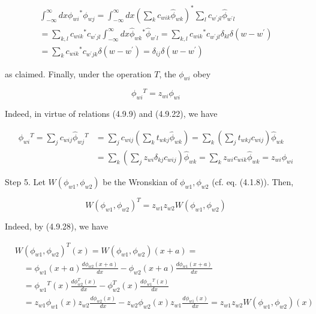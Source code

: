 \documentclass{article}
\begin{document}
\begin{gather*}
\int_{-\infty}^{\infty} d x \phi_{w i}{ }^{*} \phi_{w j}=\int_{-\infty}^{\infty} d x\left(\sum_{k} c_{w i k} \hat{\phi}_{w k}\right)^{*} \sum_{l} c_{w^{\prime} j l} \hat{\phi}_{w^{\prime} l}  \tag{4.9.27}\\
=\sum_{k, l} c_{w i k}{ }^{*} c_{w^{\prime} j l} \int_{-\infty}^{\infty} d x \hat{\phi}_{w k}{ }^{*} \hat{\phi}_{w^{\prime} l}=\sum_{k, l} c_{w i k}{ }^{*} c_{w^{\prime} j l} \delta_{k l} \delta\left(w-w^{\prime}\right) \\
=\sum_{k} c_{w i k}{ }^{*} c_{w^{\prime} j k} \delta\left(w-w^{\prime}\right)=\delta_{i j} \delta\left(w-w^{\prime}\right)
\end{gather*}
 
as claimed. Finally, under the operation $T$, the $\phi_{w i}$ obey
 
\begin{equation*}
\phi_{w i}{ }^{T}=z_{w i} \phi_{w i} \tag{4.9.28}
\end{equation*}
 

Indeed, in virtue of relations (4.9.9) and (4.9.22), we have
 
\begin{align*}
\phi_{w i}{ }^{T}=\sum_{j} c_{w i j} \hat{\phi}_{w j}{ }^{T} & =\sum_{j} c_{w i j}\left(\sum_{k} t_{w k j} \hat{\phi}_{w k}\right)=\sum_{k}\left(\sum_{j} t_{w k j} c_{w i j}\right) \hat{\phi}_{w k}  \tag{4.9.29}\\
& =\sum_{k}\left(\sum_{j} z_{w i} \delta_{k j} c_{w i j}\right) \hat{\phi}_{w k}=\sum_{k} z_{w i} c_{w i k} \hat{\phi}_{w k}=z_{w i} \phi_{w i}
\end{align*}
 

Step 5. Let $W\left(\phi_{w 1}, \phi_{w 2}\right)$ be the Wronskian of $\phi_{w 1}, \phi_{w 2}$ (cf. eq. (4.1.8)). Then,
 
\begin{equation*}
W\left(\phi_{w 1}, \phi_{w 2}\right)^{T}=z_{w 1} z_{w 2} W\left(\phi_{w 1}, \phi_{w 2}\right) \tag{4.9.30}
\end{equation*}
 

Indeed, by (4.9.28), we have
 
\begin{align*}
& W\left(\phi_{w 1}, \phi_{w 2}\right)^{T}(x)=W\left(\phi_{w 1}, \phi_{w 2}\right)(x+a)=  \tag{4.9.31}\\
& \quad=\phi_{w 1}(x+a) \frac{d \phi_{w 2}(x+a)}{d x}-\phi_{w 2}(x+a) \frac{d \phi_{w 1}(x+a)}{d x} \\
& \quad=\phi_{w 1}{ }^{T}(x) \frac{d \phi_{w 2}^{T}(x)}{d x}-\phi_{w 2}^{T}(x) \frac{d \phi_{w 1}{ }^{T}(x)}{d x} \\
& \quad=z_{w 1} \phi_{w 1}(x) z_{w 2} \frac{d \phi_{w 2}(x)}{d x}-z_{w 2} \phi_{w 2}(x) z_{w 1} \frac{d \phi_{w 1}(x)}{d x}=z_{w 1} z_{w 2} W\left(\phi_{w 1}, \phi_{w 2}\right)(x)
\end{align*}
 
\end{document}
